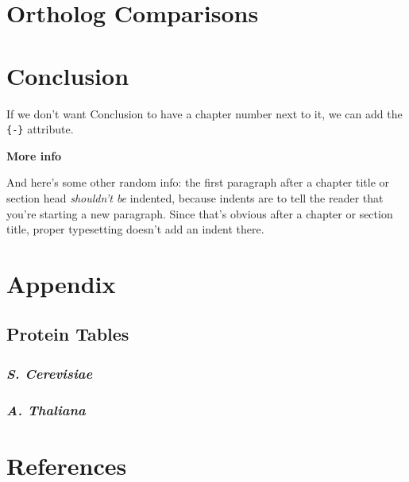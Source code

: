 \documentclass[12pt,twoside]{reedthesis}
\begin{document}
\chapter{Ortholog Comparisons}\label{OrthoComp}

\chapter*{Conclusion}\label{conclusion}

If we don't want Conclusion to have a chapter number next to it, we can add the \texttt{\{-\}} attribute.

\textbf{More info}

And here's some other random info: the first paragraph after a chapter title or section head \emph{shouldn't be} indented, because indents are to tell the reader that you're starting a new paragraph. Since that's obvious after a chapter or section title, proper typesetting doesn't add an indent there.

\chapter*{Appendix}\label{appendix}

\section*{Protein Tables}\label{protein-tables}

\subsection*{\texorpdfstring{\emph{S. Cerevisiae}}{S. Cerevisiae}}\label{s.-cerevisiae}

\subsection*{\texorpdfstring{\emph{A. Thaliana}}{A. Thaliana}}\label{a.-thaliana}

\backmatter

\chapter*{References}\label{references}
\end{document}
